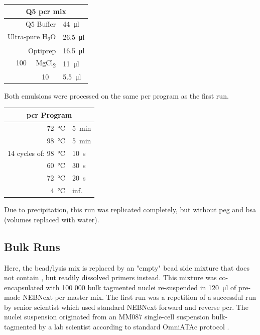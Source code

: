\begin{appendix}
\begin{multicols}{2}
\begin{center}
\begin{tabular}{r|l}
	\multicolumn{2}{c}{Q5 \acrshort{pcr} mix} \\
	\hline
	Q5 Buffer & \SI{44}{\ul} \\
	Ultra-pure H\textsubscript{2}O & \SI{26.5}{\ul}  \\
	Optiprep & \SI{16.5}{\ul} \\
	\SI{100}{\milli\molar} MgCl\textsubscript{2} & \SI{11}{\ul} \\
	\SI{10}{\milli\molar} \acrshortpl{dntp}  & \SI{5.5}{\ul} \\
\end{tabular}
\end{center}
\medskip

Both emulsions were processed on the same \acrshort{pcr} program as the first run.

\begin{center}
\begin{tabular}{r|l}
	\multicolumn{2}{c}{\acrshort{pcr} Program} \\
	\hline
	\SI{72}{\celsius} & \SI{5}{\minute} \\
	\SI{98}{\celsius} & \SI{5}{\minute} \\
	\hline
	14 cycles of: \SI{98}{\celsius} & \SI{10}{\second} \\
	\SI{60}{\celsius} & \SI{30}{\second} \\
	\SI{72}{\celsius} & \SI{20}{\second} \\
	\hline
	\SI{4}{\celsius} & inf. \\
\end{tabular}
\end{center}
\medskip

Due to precipitation, this run was replicated completely, but without \acrshort{peg} and \acrshort{bsa} (volumes replaced with water).\pms

\subsection{Bulk Runs}
 Here, the bead/lysis mix is replaced by an "empty" bead side mixture that does not contain , but readily dissolved primers instead. This mixture was co-encapsulated with 100 000 bulk tagmented nuclei re-suspended in \SI{120}{\ul} of pre-made NEBNext \acrshort{pcr} master mix. The first run was a repetition of a successful run by senior scientist which used standard NEBNext forward and reverse \acrshort{pcr}. The nuclei suspension originated from an MM087 single-cell suspension bulk-tagmented by a lab scientist according to standard OmniATAc protocol \citep{corces2017}.\pms


\end{multicols}
\end{appendix}
